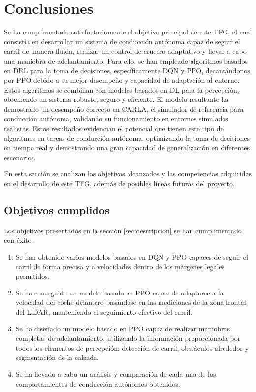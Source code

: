 \chapter{Conclusiones}
\label{cap:capitulo5}

Se ha cumplimentado satisfactoriamente el objetivo principal de este \ac{TFG}, el cual consistía en desarrollar un sistema de conducción autónoma capaz de seguir el carril de manera fluida, realizar un control de crucero adaptativo y llevar a cabo una maniobra de adelantamiento. Para ello, se han empleado algoritmos basados en \ac{DRL} para la toma de decisiones, específicamente \ac{DQN} y \ac{PPO}, decantándonos por PPO debido a su mejor desempeño y capacidad de adaptación al entorno. Estos algoritmos se combinan con modelos basados en \ac{DL} para la percepción, obteniendo un sistema robusto, seguro y eficiente. El modelo resultante ha demostrado un desempeño correcto en CARLA, el simulador de referencia para conducción autónoma, validando su funcionamiento en entornos simulados realistas. Estos resultados evidencian el potencial que tienen este tipo de algoritmos en tareas de conducción autónoma, optimizando la toma de decisiones en tiempo real y demostrando una gran capacidad de generalización en diferentes escenarios.

En esta sección se analizan los objetivos alcanzados y las competencias adquiridas en el desarrollo de este \ac{TFG}, además de posibles líneas futuras del proyecto.

\section{Objetivos cumplidos}

Los objetivos presentados en la sección \ref{sec:descripcion} se han cumplimentado con éxito.

\begin{enumerate}
\item Se han obtenido varios modelos basados en \ac{DQN} y \ac{PPO} capaces de seguir el carril de forma precisa y a velocidades dentro de los márgenes legales permitidos. 
\item Se ha conseguido un modelo basado en \ac{PPO} capaz de adaptarse a la velocidad del coche delantero basándose en las mediciones de la zona frontal del \ac{LiDAR}, manteniendo el seguimiento efectivo del carril.
\item Se ha diseñado un modelo basado en \ac{PPO} capaz de realizar maniobras completas de adelantamiento, utilizando la información proporcionada por todos los elementos de percepción: detección de carril, obstáculos alrededor y segmentación de la calzada.
\item Se ha llevado a cabo un análisis y comparación de cada uno de los comportamientos de conducción autónomos obtenidos.
\end{enumerate}

